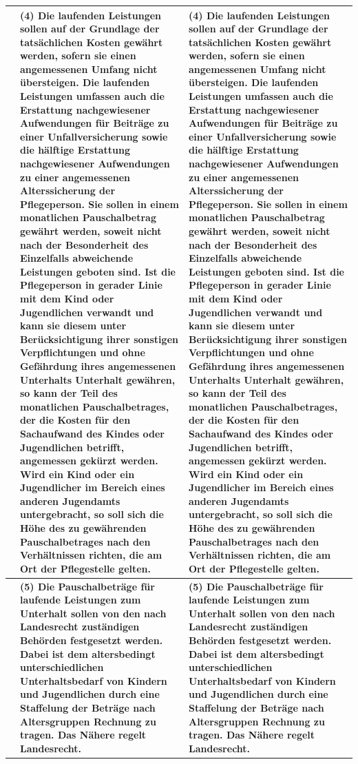 \documentclass[10pt,a4paper,landscape]{article}
\begin{document}
\begin{longtable}{|L{8.6cm}|L{8.6cm}|L{8.6cm}|}
 & \textbf{(4) Die laufenden Leistungen sollen auf der Grundlage der tatsächlichen Kosten gewährt werden, sofern sie einen angemessenen Umfang nicht übersteigen. Die laufenden Leistungen umfassen auch die Erstattung nachgewiesener Aufwendungen für Beiträge zu einer Unfallversicherung sowie die hälftige Erstattung nachgewiesener Aufwendungen zu einer angemessenen Alterssicherung der Pflegeperson. Sie sollen in einem monatlichen Pauschalbetrag gewährt werden, soweit nicht nach der Besonderheit des Einzelfalls abweichende Leistungen geboten sind. Ist die Pflegeperson in gerader Linie mit dem Kind oder Jugendlichen verwandt und kann sie diesem unter Berücksichtigung ihrer sonstigen Verpflichtungen und ohne Gefährdung ihres angemessenen Unterhalts Unterhalt gewähren, so kann der Teil des monatlichen Pauschalbetrages, der die Kosten für den Sachaufwand des Kindes oder Jugendlichen betrifft, angemessen gekürzt werden. Wird ein Kind oder ein Jugendlicher im Bereich eines anderen Jugendamts untergebracht, so soll sich die Höhe des zu gewährenden Pauschalbetrages nach den Verhältnissen richten, die am Ort der Pflegestelle gelten. } & \textbf{(4) Die laufenden Leistungen sollen auf der Grundlage der tatsächlichen Kosten gewährt werden, sofern sie einen angemessenen Umfang nicht übersteigen. Die laufenden Leistungen umfassen auch die Erstattung nachgewiesener Aufwendungen für Beiträge zu einer Unfallversicherung sowie die hälftige Erstattung nachgewiesener Aufwendungen zu einer angemessenen Alterssicherung der Pflegeperson. Sie sollen in einem monatlichen Pauschalbetrag gewährt werden, soweit nicht nach der Besonderheit des Einzelfalls }\textbf{abweichende Leistungen geboten sind. Ist die Pflegeperson in gerader Linie mit dem Kind oder Jugendlichen verwandt und kann sie diesem unter Berücksichtigung ihrer sonstigen Verpflichtungen und ohne Gefährdung ihres angemessenen Unterhalts Unterhalt gewähren, so kann der Teil des monatlichen Pauschalbetrages, der die Kosten für den Sachaufwand des Kindes oder Jugendlichen betrifft, angemessen gekürzt werden. Wird ein Kind oder ein Jugendlicher im Bereich eines anderen Jugendamts untergebracht, so soll sich die Höhe des zu gewährenden Pauschalbetrages nach den Verhältnissen richten, die am Ort der Pflegestelle gelten. } \\
\hline
 & \textbf{(5) Die Pauschalbeträge für laufende Leistungen zum Unterhalt sollen von den nach Landesrecht zuständigen Behörden festgesetzt werden. Dabei ist dem altersbedingt unterschiedlichen Unterhaltsbedarf von Kindern und Jugendlichen durch eine Staffelung der Beträge nach Altersgruppen Rechnung zu tragen. Das Nähere regelt Landesrecht. } & \textbf{(5) Die Pauschalbeträge für laufende Leistungen zum Unterhalt sollen von den nach Landesrecht zuständigen Behörden festgesetzt werden. Dabei ist dem altersbedingt unterschiedlichen Unterhaltsbedarf von Kindern und Jugendlichen durch eine Staffelung der Beträge nach Altersgruppen Rechnung zu tragen. Das Nähere regelt Landesrecht. } \\

\end{longtable}
\end{document}
